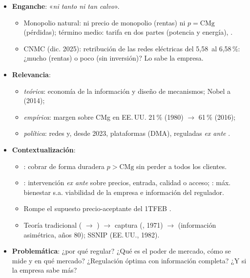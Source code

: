 \documentclass{article}
\begin{document}
\cabecerarepaso
\begin{columnas}

\begin{itemize}
\item \textbf{Enganche}: «\emph{ni tanto ni tan calvo}».
  \begin{itemize}
  \item Monopolio natural: ni precio de monopolio (rentas) ni $p=\mathrm{CMg}$ (pérdidas); término medio: tarifa en dos partes (potencia y energía), .
  \item CNMC (dic. 2025): retribución de las redes eléctricas del 5,58~al 6,58\,\%: ¿mucho (rentas) o poco (sin inversión)? Lo sabe la empresa.
  \end{itemize}
\item \textbf{Relevancia}:
  \begin{itemize}
  \item \emph{teórica}: economía de la información y diseño de mecanismos; Nobel a  (2014);
  \item \emph{empírica}: margen sobre CMg en EE.\,UU. 21\,\% (1980) $\to$ 61\,\% (2016);
  \item \emph{política}: redes y, desde 2023, plataformas (DMA), reguladas \emph{ex ante}  .
  \end{itemize}
\item \textbf{Contextualización}:
  \begin{itemize}
  \item {}: cobrar de forma duradera $p>\mathrm{CMg}$ sin perder a todos los clientes.
  \item {}: intervención \emph{ex ante} sobre precios, entrada, calidad o acceso; : máx. bienestar s.a. viabilidad de la empresa e información del regulador.
  \item Rompe el supuesto precio-aceptante del 1TFEB .
  \item Teoría tradicional ( $\to$ ) $\to$ captura (, 1971) $\to$  (información asimétrica, años 80); SSNIP (EE.\,UU., 1982).
  \end{itemize}
\item \textbf{Problemática}: ¿por qué regular? ¿Qué es el poder de mercado, cómo se mide y en qué mercado? ¿Regulación óptima con información completa? ¿Y si la empresa sabe más?

\end{itemize}
\end{columnas}
\end{document}
